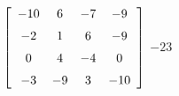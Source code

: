 {$\left[ \begin {array}{cccc} -10&6&-7&-9\\\noalign{\medskip}-2&1&6&-9
\\\noalign{\medskip}0&4&-4&0\\\noalign{\medskip}-3&-9&3&-10
\end {array} \right] $} 
{$-23$}



  

